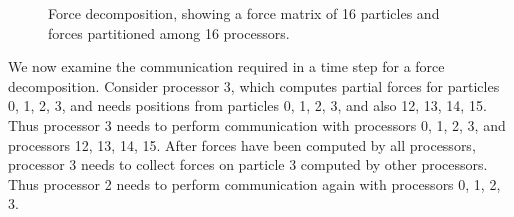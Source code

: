 \begin{figure}[htbp]
\begin{center}
\caption{Force decomposition, showing a force matrix of 16 particles and 
forces partitioned among 16 processors.
}
\label{fig:force}
\end{center}
\end{figure}

We now examine the communication required in a time step
for a force decomposition.  Consider processor 3, which computes partial forces for
particles 0, 1, 2, 3, and needs positions from particles 0, 1, 2, 3, and
also 12, 13, 14, 15.  Thus processor 3 needs to perform communication with
processors 0, 1, 2, 3, and processors 12, 13, 14, 15.  After forces have
been computed by all processors, processor 3 needs to collect forces
on particle 3 computed by other processors.  Thus processor 2 needs to perform
communication again with processors 0, 1, 2, 3.

